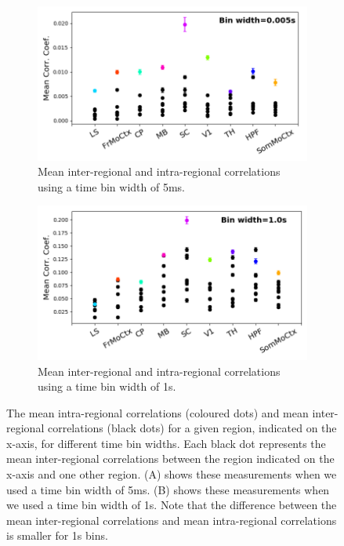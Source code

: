   \begin{figure}[p]
    \begin{subfigure}[h]{\linewidth}
      \centering
      \includegraphics[width=0.7\linewidth]{figures/eight_probe/Krebs_0p005_corr_comp.png}
      \caption{Mean inter-regional and intra-regional correlations using a time bin width of 5ms.}
      \label{fig:short_bin_corr_comp}
    \end{subfigure}
    \begin{subfigure}[h]{\linewidth}
      \centering
      \includegraphics[width=0.7\linewidth]{figures/eight_probe/Krebs_1p0_corr_comp.png}
      \caption{Mean inter-regional and intra-regional correlations using a time bin width of 1s.}
      \label{fig:long_bin_corr_comp}
    \end{subfigure}
    \caption{The mean intra-regional correlations (coloured dots) and mean inter-regional correlations (black dots) for a given region, indicated on the x-axis, for different time bin widths. Each black dot represents the mean inter-regional correlations between the region indicated on the x-axis and one other region. (A) shows these measurements when we used a time bin width of 5ms. (B) shows these measurements when we used a time bin width of 1s. Note that the difference between the mean inter-regional correlations and mean intra-regional correlations is smaller for 1s bins.}
    \label{fig:corr_comps}
  \end{figure}

